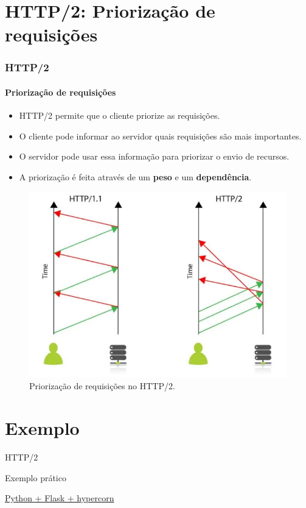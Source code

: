 \documentclass[
	9pt, %
	t, %
]{beamer}
\newcommand{\iconLink}[2]{\href{#1}{\faLink \hspace{0.2em} {#2}}}
\begin{document}
\section{HTTP/2: Priorização de requisições}

\begin{frame}
	\frametitle{HTTP/2}
	\framesubtitle{Priorização de requisições}

	\begin{itemize}
		\item HTTP/2 permite que o cliente priorize as requisições.
		\item O cliente pode informar ao servidor quais requisições são mais importantes.
		\item O servidor pode usar essa informação para priorizar o envio de recursos.
		\item A priorização é feita através de um \textbf{peso} e um \textbf{dependência}.
	\end{itemize}

	\begin{figure}
		\centering
		\includegraphics[width=0.7\linewidth]{http2_priority.png}
		\caption{Priorização de requisições no HTTP/2.}
	\end{figure}

\end{frame}

\section{Exemplo}

\begin{frame}
	\begin{center}
		
		\bigskip\bigskip\bigskip\bigskip %
		{\Large HTTP/2}
		
		\bigskip\bigskip %
		{\Huge Exemplo prático}

		\bigskip\bigskip %
		{\small \iconLink{https://gist.github.com/fabricioifc/347d275a65f1ba3371eb854f78d052ec}{Python + Flask + hypercorn}}
	\end{center}

\end{frame}
\end{document}
